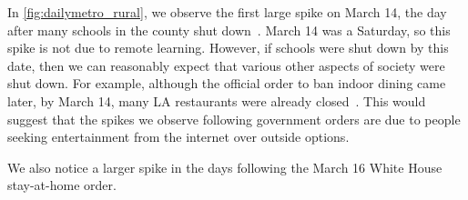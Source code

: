 In \cref{fig:dailymetro_rural}, we observe the first large spike on March 14, the day after many schools in the county shut down~\cite{haire2020LA}. March 14 was a Saturday, so this spike is not due to remote learning. However, if schools were shut down by this date, then we can reasonably expect that various other aspects of society were shut down. For example, although the official order to ban indoor dining came later, by March 14, many \gls{LA} restaurants were already closed~\cite{eater2020}. This would suggest that the spikes we observe following government orders are due to people seeking entertainment from the internet over outside options.

We also notice a larger spike in the days following the March 16 White House stay-at-home order.